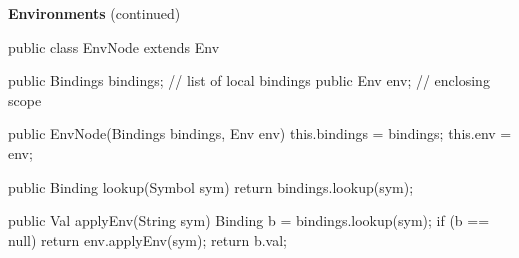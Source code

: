 \begin{minipage}[t]{\sw}
\slidenumber
\LARGE
{\bf Environments} (continued)
{\Large
\begin{qv}
public class EnvNode extends Env {

    public Bindings bindings; // list of local bindings
    public Env env;           // enclosing scope
    
    public EnvNode(Bindings bindings, Env env) {
        this.bindings = bindings;
        this.env = env;
    }

    public Binding lookup(Symbol sym) {
        return bindings.lookup(sym);
    } 

    public Val applyEnv(String sym) {
        Binding b = bindings.lookup(sym);
        if (b == null)
            return env.applyEnv(sym);
        return b.val;
    }

}
\end{qv}
}
\end{minipage}
\clearpage
